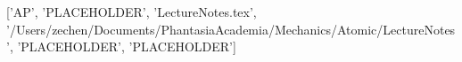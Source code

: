 ['AP', 'PLACEHOLDER', 'LectureNotes.tex', '/Users/zechen/Documents/PhantasiaAcademia/Mechanics/Atomic/LectureNotes', 'PLACEHOLDER', 'PLACEHOLDER']
